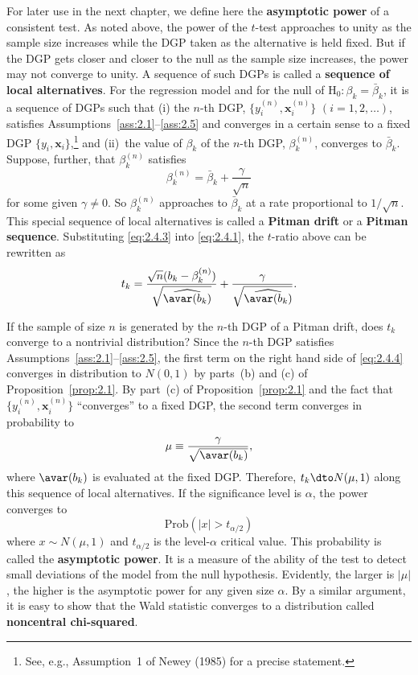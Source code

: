 For later use in the next chapter, we define here the \textbf{asymptotic power} of a
consistent test.  As noted above, the power of the $t$-test approaches to unity as
the sample size increases while the DGP taken as the alternative is held fixed.
But if the DGP gets closer and closer to the null as the sample size increases, the
power may not converge to unity.  A sequence of such DGPs is called a
\textbf{sequence of local alternatives}.  For the regression model and for the null
of $\mathrm{H}_0\colon \beta_k = \bar{\beta}_k$, it is a sequence of DGPs such
that (i) the $n$-th DGP, $\{y_i^{(n)}, \mathbf{x}_i^{(n)}\}$
$(i = 1, 2, \ldots)$, satisfies Assumptions~\ref{ass:2.1}--\ref{ass:2.5} and
converges in a certain sense to a fixed DGP
$\{y_i, \mathbf{x}_i\}$,\footnote{See, e.g., Assumption~1 of Newey (1985) for a
precise statement.} and (ii)~the value of $\beta_k$ of the $n$-th DGP,
$\beta_k^{(n)}$, converges to $\bar{\beta}_k$.  Suppose, further, that
$\beta_k^{(n)}$ satisfies
\begin{equation}
  \beta_k^{(n)} = \bar{\beta}_k + \frac{\gamma}{\sqrt{n}}
  \label{eq:2.4.3}
\end{equation}
for some given $\gamma \neq 0$.  So $\beta_k^{(n)}$ approaches to $\bar{\beta}_k$
at a rate proportional to $1/\sqrt{n}$.  This special sequence of local alternatives
is called a \textbf{Pitman drift} or a \textbf{Pitman sequence}.  Substituting
\eqref{eq:2.4.3} into \eqref{eq:2.4.1}, the $t$-ratio above can be rewritten as
\begin{equation}
  t_k = \frac{\sqrt{n}(b_k - \beta_k^{(n)})}
  {\sqrt{\widehat{\avar(b_k)}}}
  + \frac{\gamma}{\sqrt{\widehat{\avar(b_k)}}}.
  \label{eq:2.4.4}
\end{equation}

If the sample of size $n$ is generated by the $n$-th DGP of a Pitman drift, does
$t_k$ converge to a nontrivial distribution?  Since the $n$-th DGP satisfies
Assumptions~\ref{ass:2.1}--\ref{ass:2.5}, the first term on the right hand side of
\eqref{eq:2.4.4} converges in distribution to $N(0,1)$ by parts~(b) and (c) of
Proposition~\ref{prop:2.1}.  By part~(c) of Proposition~\ref{prop:2.1} and the fact
that $\{y_i^{(n)}, \mathbf{x}_i^{(n)}\}$ ``converges'' to a fixed DGP, the second
term converges in probability to
\begin{equation}
  \mu \equiv \frac{\gamma}{\sqrt{\avar(b_k)}},
  \label{eq:2.4.5}
\end{equation}
where $\avar(b_k)$ is evaluated at the fixed DGP.  Therefore,
$t_k \dto N(\mu, 1)$ along this sequence of local alternatives.  If the significance
level is $\alpha$, the power converges to
\begin{equation}
  \mathrm{Prob}(|x| > t_{\alpha/2})
  \label{eq:2.4.6}
\end{equation}
where $x \sim N(\mu, 1)$ and $t_{\alpha/2}$ is the level-$\alpha$ critical value.
This probability is called the \textbf{asymptotic power}.  It is a measure of the
ability of the test to detect small deviations of the model from the null hypothesis.
Evidently, the larger is $|\mu|$, the higher is the asymptotic power for any given
size $\alpha$.  By a similar argument, it is easy to show that the Wald statistic
converges to a distribution called \textbf{noncentral chi-squared}.


